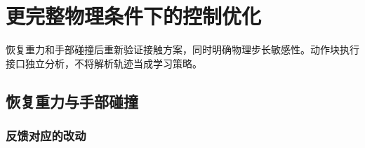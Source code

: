 \chapter{更完整物理条件下的控制优化}

恢复重力和手部碰撞后重新验证接触方案，同时明确物理步长敏感性。动作块执行接口独立分析，不将解析轨迹当成学习策略。

\section{恢复重力与手部碰撞}

\label{stage:s13}

\subsection{反馈对应的改动}\label{s13-detail-1}

